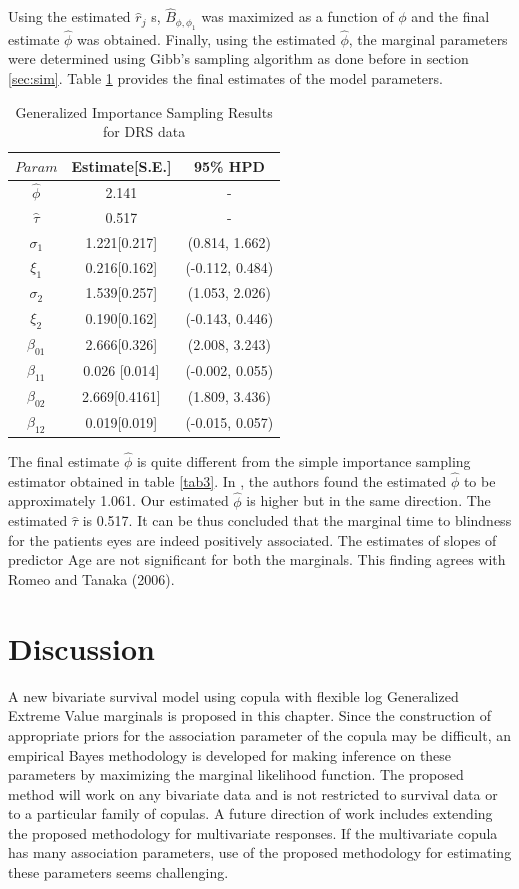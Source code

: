 \documentclass[11pt]{article}
\theoremstyle{remboldstyle}
\begin{document}
\noindent
Using the estimated $\hat{r}_j$ s, $\hat{B}_{\phi, \phi_1}$ was maximized as a function of $\phi$ and the final estimate $\hat{\phi}$ was obtained. Finally, using the estimated $\hat{\phi}$, the marginal parameters were determined using Gibb's sampling algorithm as done before in section \ref{sec:sim}. Table \ref{tab5} provides the final estimates of the model parameters. 
\begin{table}[H]
\caption{Generalized Importance Sampling Results for DRS data}
\centering
\begin{tabular}{c c c}
\hline
$Param$      & Estimate[S.E.] & 95\% HPD\\
\hline
$\hat{\phi}$ & 2.141              & -\\
$\hat{\tau}$ & 0.517              & -\\
$\sigma_1$      & 1.221[0.217]        & (0.814, 1.662)\\   
$\xi_1$      & 0.216[0.162]        & (-0.112, 0.484)\\
$\sigma_2$ & 1.539[0.257]              & (1.053, 2.026)\\
$\xi_2$      & 0.190[0.162]        & (-0.143, 0.446)\\   
$\beta_{01}$      & 2.666[0.326]        & (2.008, 3.243)\\
$\beta_{11}$ & 0.026 [0.014]             & (-0.002, 0.055)\\
$\beta_{02}$      & 2.669[0.4161]        & (1.809, 3.436)\\   
$\beta_{12}$      & 0.019[0.019]        & (-0.015, 0.057)\\
 \hline             
\end{tabular}
\label{tab5}
\end{table}
\noindent
The final estimate $\hat{\phi}$ is quite different from the simple importance sampling estimator obtained in table \ref{tab3}. In \cite{romeo:tanaka:2006}, the authors found the estimated $\hat{\phi}$ to be approximately 1.061. Our estimated $\hat{\phi}$ is higher but in the same direction. The estimated $\hat{\tau}$ is 0.517. It can be thus concluded that the marginal time to blindness for the patients eyes are indeed positively associated. The estimates of slopes of predictor Age are not significant for both the marginals. This finding agrees with Romeo and Tanaka (2006). 
\section{Discussion}
\label{sec:dis}
\noindent
A new bivariate survival model using copula with flexible log Generalized Extreme Value marginals is proposed in this chapter. Since the construction of appropriate priors for the association parameter of the copula may be difficult, an empirical Bayes methodology is developed for making inference on these parameters by maximizing the marginal likelihood function. The proposed method will work on any bivariate data and is not restricted to survival data or to a particular family of copulas. A future direction of work includes extending the proposed methodology for multivariate responses. If the multivariate copula has many association parameters, use of the proposed methodology for estimating these parameters seems challenging. 



\end{document}
